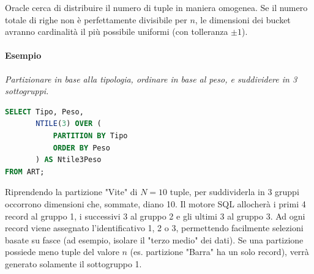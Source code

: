 Oracle cerca di distribuire il numero di tuple in maniera omogenea. Se il numero totale di righe non è perfettamente divisibile per $n$, le dimensioni dei bucket avranno cardinalità il più possibile uniformi (con tolleranza $\pm 1$).

\paragraph{Esempio}
\textit{Partizionare in base alla tipologia, ordinare in base al peso, e suddividere in 3 sottogruppi.}
\begin{lstlisting}[language=SQL, basicstyle=\small\ttfamily, keywordstyle=\bfseries\color{blue}, frame=single]
SELECT Tipo, Peso, 
       NTILE(3) OVER (
           PARTITION BY Tipo
           ORDER BY Peso
       ) AS Ntile3Peso
FROM ART;
\end{lstlisting}

Riprendendo la partizione "Vite" di $N=10$ tuple, per suddividerla in 3 gruppi occorrono dimensioni che, sommate, diano 10. Il motore SQL allocherà i primi 4 record al gruppo 1, i successivi 3 al gruppo 2 e gli ultimi 3 al gruppo 3. Ad ogni record viene assegnato l'identificativo 1, 2 o 3, permettendo facilmente selezioni basate su fasce (ad esempio, isolare il "terzo medio" dei dati). Se una partizione possiede meno tuple del valore $n$ (es. partizione "Barra" ha un solo record), verrà generato solamente il sottogruppo 1.